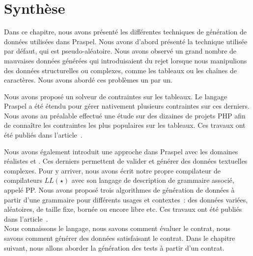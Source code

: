 \section{Synthèse}
\label{section:data:summary}

Dans ce chapitre, nous avons présenté les différentes techniques de génération
de données utilisées dans Praspel. Nous avons d'abord présenté la technique
utilisée par défaut, qui est pseudo-aléatoire. Nous avons observé un grand
nombre de mauvaises données générées qui introduisaient du rejet lorsque nous
manipulions des données structurelles ou complexes, comme les tableaux ou les
chaînes de caractères. Nous avons abordé ces problèmes un par un.

Nous avons proposé un solveur de contraintes sur les tableaux. Le langage
Praspel a été étendu pour gérer nativement plusieurs contraintes sur ces
derniers. Nous avons au préalable effectué une étude sur des dizaines de projets
PHP afin de connaître les contraintes les plus populaires sur les tableaux. Ces
travaux ont été publiés dans l'article~.

Nous avons également introduit une approche 
dans Praspel avec les domaines réalistes  et . Ces
derniers permettent de valider et générer des données textuelles complexes.
Pour y arriver, nous avons écrit notre propre compilateur de compilateurs
$LL(\star)$ avec son langage de description de grammaire associé, appelé PP.
Nous avons proposé trois algorithmes de génération de données à partir d'une
grammaire pour différents usages et contextes~: des données variées, aléatoires,
de taille fixe, bornée ou encore libre etc. Ces travaux ont été publiés dans
l'article~. \\

Nous connaissons le langage, nous savons comment évaluer le contrat, nous savons
comment générer des données satisfaisant le contrat. Dans le chapitre suivant,
nous allons aborder la génération des tests à partir d'un contrat.
